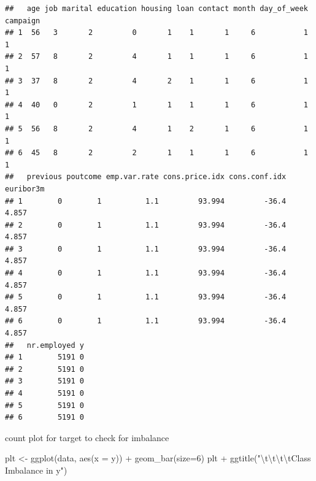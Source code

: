 \documentclass[
]{article}
\newenvironment{Shaded}{\begin{snugshade}}{\end{snugshade}}
\newcommand{\AttributeTok}[1]{\textcolor[rgb]{0.77,0.63,0.00}{#1}}
\newcommand{\DecValTok}[1]{\textcolor[rgb]{0.00,0.00,0.81}{#1}}
\newcommand{\FunctionTok}[1]{\textcolor[rgb]{0.00,0.00,0.00}{#1}}
\newcommand{\NormalTok}[1]{#1}
\newcommand{\OtherTok}[1]{\textcolor[rgb]{0.56,0.35,0.01}{#1}}
\newcommand{\SpecialCharTok}[1]{\textcolor[rgb]{0.00,0.00,0.00}{#1}}
\newcommand{\StringTok}[1]{\textcolor[rgb]{0.31,0.60,0.02}{#1}}
\begin{document}
\begin{verbatim}
##   age job marital education housing loan contact month day_of_week campaign
## 1  56   3       2         0       1    1       1     6           1        1
## 2  57   8       2         4       1    1       1     6           1        1
## 3  37   8       2         4       2    1       1     6           1        1
## 4  40   0       2         1       1    1       1     6           1        1
## 5  56   8       2         4       1    2       1     6           1        1
## 6  45   8       2         2       1    1       1     6           1        1
##   previous poutcome emp.var.rate cons.price.idx cons.conf.idx euribor3m
## 1        0        1          1.1         93.994         -36.4     4.857
## 2        0        1          1.1         93.994         -36.4     4.857
## 3        0        1          1.1         93.994         -36.4     4.857
## 4        0        1          1.1         93.994         -36.4     4.857
## 5        0        1          1.1         93.994         -36.4     4.857
## 6        0        1          1.1         93.994         -36.4     4.857
##   nr.employed y
## 1        5191 0
## 2        5191 0
## 3        5191 0
## 4        5191 0
## 5        5191 0
## 6        5191 0
\end{verbatim}

count plot for target to check for imbalance

\begin{Shaded}
\begin{Highlighting}[]
\NormalTok{plt }\OtherTok{\textless{}{-}} \FunctionTok{ggplot}\NormalTok{(data, }\FunctionTok{aes}\NormalTok{(}\AttributeTok{x =}\NormalTok{ y)) }\SpecialCharTok{+} \FunctionTok{geom\_bar}\NormalTok{(}\AttributeTok{size=}\DecValTok{6}\NormalTok{) }
\NormalTok{plt }\SpecialCharTok{+} \FunctionTok{ggtitle}\NormalTok{(}\StringTok{"}\SpecialCharTok{\textbackslash{}t\textbackslash{}t\textbackslash{}t\textbackslash{}t}\StringTok{Class Imbalance in y"}\NormalTok{)}
\end{Highlighting}
\end{Shaded}
\end{document}
